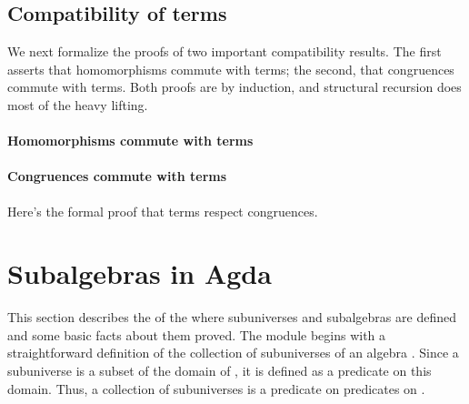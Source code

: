 \documentclass[a4paper,USenglish,cleveref,autoref,thm-restate]{lipics-v2019}
\begin{document}
\subsection{Compatibility of terms}
We next formalize the proofs of two important compatibility results. The first asserts that homomorphisms commute with terms; the second, that congruences commute with terms.  Both proofs are by induction, and structural recursion does most of the heavy lifting.
\paragraph*{Homomorphisms commute with terms}\label{sec:homomorphisms-commute-with-terms}
\begin{code}\end{code}

\paragraph*{Congruences commute with terms}\label{sec:congruences-commute-with-terms}
Here's the formal proof that terms respect congruences.
\begin{code}\end{code}



\section{Subalgebras in Agda}\label{sec:sec:subs-in-agda}
This section describes the \subsmodule of the \agdaualib where subuniverses and subalgebras are defined and some basic facts about them proved. The module begins with a straightforward definition of the collection of subuniverses of an algebra \algA. Since a subuniverse is a subset of the domain \univA of \algA, it is defined as a predicate on this domain. Thus, a collection of subuniverses is a predicate on predicates on \univA.
\begin{code}\end{code}

\end{document}
